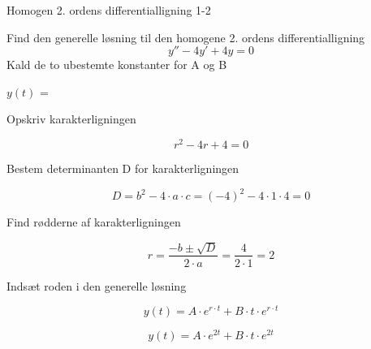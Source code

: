 \documentclass{article}
\begin{document}
\begin{exercise}{Homogen 2. ordens differentialligning 1-2}
	
	Find den generelle løsning til den homogene 2. ordens differentialligning
	\[
	y'' - 4y' + 4y = 0
	\]
	Kald de to ubestemte konstanter for A og B
	
	$y(t)$ = 
	
	
	\hint 
	
	Opskriv karakterligningen
	
	\hint
	
	\[
	r^2 - 4r + 4 = 0
	\]
	
	
	\hint
	
	Bestem determinanten D for karakterligningen
	
	
	\hint 
	\[
	D = b^2 - 4 \cdot a \cdot c = (-4)^2 - 4 \cdot 1 \cdot 4  = 0
	\]
	
	\hint 
	Find rødderne af karakterligningen
	
	
	\hint
	
	\[
	r = \frac{-b \pm \sqrt{D}}{2 \cdot a} = \frac{4}{2 \cdot 1} = 2
	\]
	
	\hint
	
	Indsæt roden i den generelle løsning
	
	\hint
	\[
	y(t) = A \cdot e^{r \cdot t} + B \cdot t \cdot e^{r \cdot t}
	\]
	
	\hint
	
	\[
	y(t) = A \cdot e^{2t} + B \cdot t \cdot e^{2t}
	\]
	
	
\end{exercise}

\newpage
\end{document}
